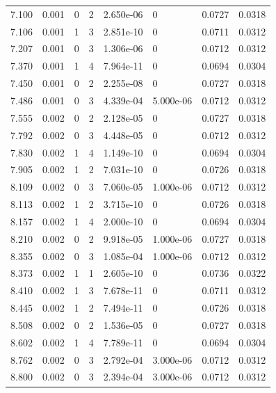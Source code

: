 \documentclass[preview]{standalone}
\begin{document}
{{{\begin{tabular}{L{1.2cm}C{1.2cm} C{0.3cm}C{0.5cm} C{1.4cm}C{1.4cm} C{1.4cm}C{1.4cm}}
  7.100  &  0.001  & 0     &  2 &  2.650e-06  & 0  & 0.0727 &  0.0318   \\ 
  7.106  &  0.001  & 1     &  3 &  2.851e-10  & 0  & 0.0711 &  0.0312   \\ 
  7.207  &  0.001  & 0     &  3 &  1.306e-06  & 0  & 0.0712 &  0.0312   \\ 
  7.370  &  0.001  & 1     &  4 &  7.964e-11  & 0  & 0.0694 &  0.0304   \\ 
  7.450  &  0.001  & 0     &  2 &  2.255e-08  & 0  & 0.0727 &  0.0318   \\ 
  7.486  &  0.001  & 0     &  3 &  4.339e-04  & 5.000e-06  & 0.0712 &  0.0312   \\ 
  7.555  &  0.002  & 0     &  2 &  2.128e-05  & 0  & 0.0727 &  0.0318   \\ 
  7.792  &  0.002  & 0     &  3 &  4.448e-05  & 0  & 0.0712 &  0.0312   \\ 
  7.830  &  0.002  & 1     &  4 &  1.149e-10  & 0  & 0.0694 &  0.0304   \\ 
  7.905  &  0.002  & 1     &  2 &  7.031e-10  & 0  & 0.0726 &  0.0318   \\ 
  8.109  &  0.002  & 0     &  3 &  7.060e-05  & 1.000e-06  & 0.0712 &  0.0312   \\ 
  8.113  &  0.002  & 1     &  2 &  3.715e-10  & 0  & 0.0726 &  0.0318   \\ 
  8.157  &  0.002  & 1     &  4 &  2.000e-10  & 0  & 0.0694 &  0.0304   \\ 
  8.210  &  0.002  & 0     &  2 &  9.918e-05  & 1.000e-06  & 0.0727 &  0.0318   \\ 
  8.355  &  0.002  & 0     &  3 &  1.085e-04  & 1.000e-06  & 0.0712 &  0.0312   \\ 
  8.373  &  0.002  & 1     &  1 &  2.605e-10  & 0  & 0.0736 &  0.0322   \\ 
  8.410  &  0.002  & 1     &  3 &  7.678e-11  & 0  & 0.0711 &  0.0312   \\ 
  8.445  &  0.002  & 1     &  2 &  7.494e-11  & 0  & 0.0726 &  0.0318   \\ 
  8.508  &  0.002  & 0     &  2 &  1.536e-05  & 0  & 0.0727 &  0.0318   \\ 
  8.602  &  0.002  & 1     &  4 &  7.789e-11  & 0  & 0.0694 &  0.0304   \\ 
  8.762  &  0.002  & 0     &  3 &  2.792e-04  & 3.000e-06  & 0.0712 &  0.0312   \\ 
  8.800  &  0.002  & 0     &  3 &  2.394e-04  & 3.000e-06  & 0.0712 &  0.0312   \\ 

\end{tabular}}}}
\end{document}
